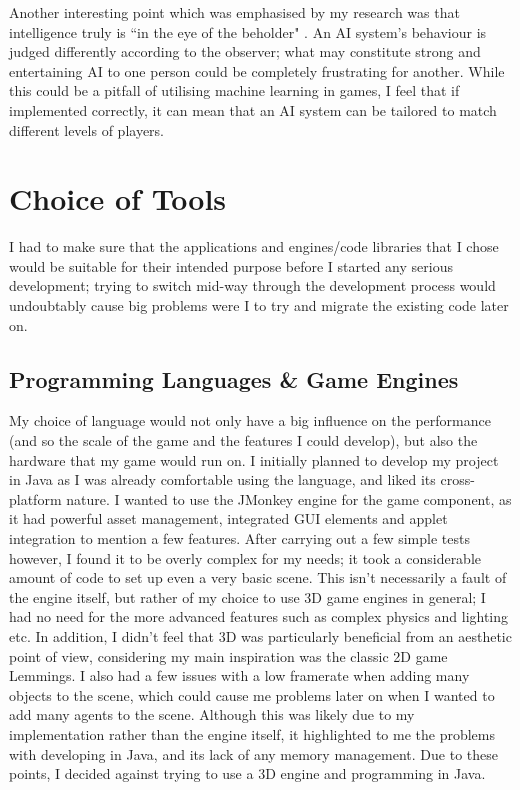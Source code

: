 \documentclass[a4paper,oneside]{report}
\begin{document}
Another interesting point which was emphasised by my research was that intelligence truly is ``in the eye of the beholder" \cite{:hc}. An AI system's behaviour is judged differently according to the observer; what may constitute strong and entertaining AI to one person could be completely frustrating for another. While this could be a pitfall of utilising machine learning in games, I feel that if implemented correctly, it can mean that an AI system can be tailored to match different levels of players.
	
\chapter{Choice of Tools}

I had to make sure that the applications and engines/code libraries that I chose would be suitable for their intended purpose before I started any serious development; trying to switch mid-way through the development process would undoubtably cause big problems were I to try and migrate the existing code later on.

\section{Programming Languages \& Game Engines}

My choice of language would not only have a big influence on the performance (and so the scale of the game and the features I could develop), but also the hardware that my game would run on. I initially planned to develop my project in Java as I was already comfortable using the language, and liked its cross-platform nature. I wanted to use the JMonkey engine for the game component, as it had powerful asset management, integrated GUI elements and applet integration to mention a few features. After carrying out a few simple tests however, I found it to be overly complex for my needs; it took a considerable amount of code to set up even a very basic scene. This isn't necessarily a fault of the engine itself, but rather of my choice to use 3D game engines in general; I had no need for the more advanced features such as complex physics and lighting etc. In addition, I didn't feel that 3D was particularly beneficial from an aesthetic point of view, considering my main inspiration was the classic 2D game Lemmings. I also had a few issues with a low framerate when adding many objects to the scene, which could cause me problems later on when I wanted to add many agents to the scene. Although this was likely due to my implementation rather than the engine itself, it highlighted to me the problems with developing in Java, and its lack of any memory management. Due to these points, I decided against trying to use a 3D engine and programming in Java.
\end{document}
